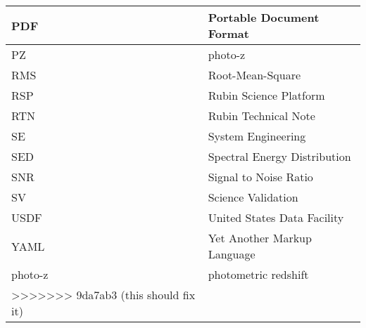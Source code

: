 \begin{longtable}{p{}p{}}
PDF & Portable Document Format \\\hline
PZ & photo-z \\\hline
RMS & Root-Mean-Square \\\hline
RSP & Rubin Science Platform \\\hline
RTN & Rubin Technical Note \\\hline
SE & System Engineering \\\hline
SED & Spectral Energy Distribution \\\hline
SNR & Signal to Noise Ratio \\\hline
SV & Science Validation \\\hline
USDF & United States Data Facility \\\hline
YAML & Yet Another Markup Language \\\hline
photo-z & photometric redshift \\\hline
>>>>>>> 9da7ab3 (this should fix it)
\end{longtable}
